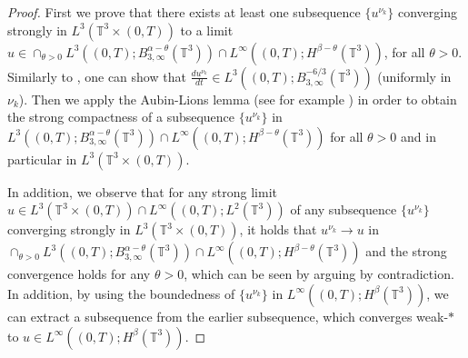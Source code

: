 \documentclass[12pt,a4paper]{article}
\theoremstyle{definition}
\theoremstyle{remark}
\numberwithin{equation}{section}
\begin{document}
\begin{proof}
First we prove that there exists at least one subsequence $\{ u^{\nu_k} \}$ converging strongly in $L^3 (\mathbb{T}^3 \times (0,T))$ to a limit $u \in \cap_{\theta > 0} L^3 ((0,T); B^{\alpha-\theta}_{3,\infty} (\mathbb{T}^3)) \cap L^\infty ((0,T); H^{\beta - \theta} (\mathbb{T}^3))$, for all $\theta > 0$. Similarly to \cite{drivaseyink}, one can show that $\frac{d u^{\nu_k}}{d t} \in L^3 ((0,T);B^{-6/3}_{3,\infty} (\mathbb{T}^3))$ (uniformly in $\nu_k$). Then we apply the Aubin-Lions lemma (see for example \cite{robinsonbook,boyer}) in order to obtain the strong compactness of a subsequence $\{ u^{\nu_k} \}$ in $L^3 ((0,T);B^{\alpha - \theta}_{3,\infty} (\mathbb{T}^3)) \cap L^\infty ((0,T); H^{\beta - \theta} (\mathbb{T}^3))$ for all $\theta > 0$ and in particular in $L^3 (\mathbb{T}^3 \times (0,T))$. 

In addition, we observe that for any strong limit $u \in L^3 (\mathbb{T}^3 \times (0,T)) \cap L^\infty ((0,T); L^2 (\mathbb{T}^3))$ of any subsequence $\{ u^{\nu_k} \}$ converging strongly in $L^3 (\mathbb{T}^3 \times (0,T))$, it holds that $u^{\nu_k} \rightarrow u$ in $\cap_{\theta > 0} L^3 ((0,T); B^{\alpha-\theta}_{3,\infty} (\mathbb{T}^3)) \cap L^\infty ((0,T); H^{\beta - \theta} (\mathbb{T}^3))$ and the strong convergence holds for any $\theta > 0$, which can be seen by arguing by contradiction. In addition, by using the boundedness of $\{ u^{\nu_k} \}$ in $L^\infty ((0,T); H^{\beta} (\mathbb{T}^3))$, we can extract a subsequence from the earlier subsequence, which converges weak-$*$ to $u \in L^\infty ((0,T); H^{\beta} (\mathbb{T}^3))$.


\end{proof}
\end{document}
